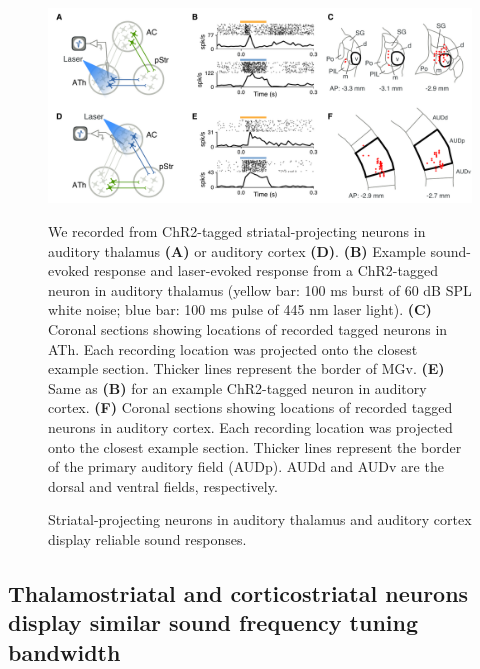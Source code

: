 \begin{figure}[hp]
  \begin{center}
    \includegraphics[width=6in]{figures/chapter3/fig3_noise_laser}%
  \end{center}
\caption{Striatal-projecting neurons in auditory thalamus and auditory cortex display reliable sound responses. 
}{We recorded from ChR2-tagged striatal-projecting neurons in auditory thalamus \textbf{(A)} or auditory cortex \textbf{(D)}.
%
\textbf{(B)} Example sound-evoked response and laser-evoked response from a ChR2-tagged neuron in auditory thalamus (yellow bar: 100 ms burst of 60 dB SPL white noise; blue bar: 100 ms pulse of 445 nm laser light). 
%
\textbf{(C)} Coronal sections showing locations of recorded tagged neurons in ATh. Each recording location was projected onto the closest example section. Thicker lines represent the border of MGv.
%
\textbf{(E)} Same as \textbf{(B)} for an example ChR2-tagged neuron in auditory cortex. 
%
\textbf{(F)} Coronal sections showing locations of recorded tagged neurons in auditory cortex. Each recording location was projected onto the closest example section. Thicker lines represent the border of the primary auditory field (AUDp). AUDd and AUDv are the dorsal and ventral fields, respectively. 
}
\end{figure}

\subsection{Thalamostriatal and corticostriatal neurons display similar sound frequency tuning bandwidth}

